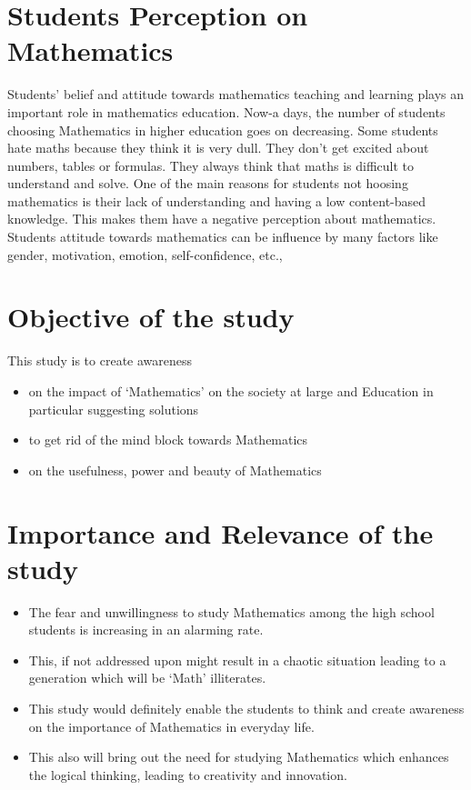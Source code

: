 \documentclass{article}
\begin{document}
\section{Students Perception on Mathematics}
Students’ belief and attitude towards mathematics teaching and learning plays an important role in mathematics education. Now-a days, the number of students choosing Mathematics in higher education goes on decreasing. Some students hate maths because they think it is very dull. They don’t get excited about numbers, tables or formulas. They always think that maths is difficult to understand and solve. One of the main reasons for students not
 hoosing mathematics is their lack of understanding and having a low content-based knowledge. This makes them have a negative perception about mathematics. Students attitude towards mathematics can be influence by many factors like gender, motivation, emotion, self-confidence, etc.,
\cite{blazar2017teacher}

\section{Objective of the study}
This study is to create awareness
\begin{itemize}
    \item on the impact of ‘Mathematics’ on the society at large and Education in particular suggesting solutions
    \item to get rid of the mind block towards Mathematics
    \item on the usefulness, power and beauty of Mathematics
\end{itemize}
\cite{dimartino2011attitude}

\section{Importance and Relevance of the study}
\begin{itemize}
    \item  The fear and unwillingness to study Mathematics among the high school students is increasing in an alarming rate.
    \item This, if not addressed upon might result in a chaotic situation leading to a generation which will be ‘Math’ illiterates.
    \item This study would definitely enable the students to think and create awareness on the importance of Mathematics in everyday life.
    \item This also will bring out the need for studying Mathematics which enhances the logical thinking, leading to creativity and innovation.
\end{itemize}
\end{document}
